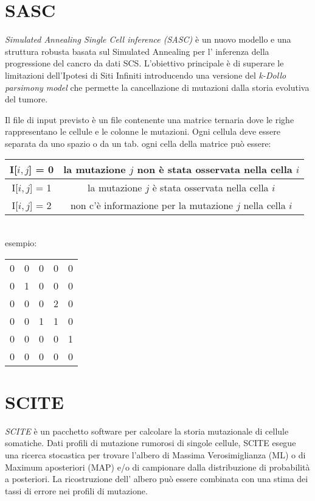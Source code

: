 \section{SASC}
\textit{Simulated Annealing Single Cell inference (SASC)}\cite{sasc} è un nuovo modello e una struttura robusta basata sul Simulated Annealing per l' inferenza della progressione del cancro da dati SCS. L'obiettivo principale è di superare le limitazioni dell'Ipotesi di Siti Infiniti introducendo una versione del \textit{k-Dollo parsimony model} che permette la cancellazione di mutazioni dalla storia evolutiva del tumore.

Il file di input previsto è un file contenente una matrice ternaria dove le righe rappresentano le cellule e le colonne le mutazioni. Ogni cellula deve essere separata da uno spazio o da un tab. ogni cella della matrice può essere:
\begin{center}
\begin{tabular}{ | c | c | }
	\hline
	I[$i,j$] = 0 & la mutazione $j$ non è stata osservata nella cella $i$ \\
	\hline
	I[$i,j$] = 1 & la mutazione $j$ è stata osservata nella cella $i$ \\
	\hline
	I[$i,j$] = 2 & non c'è informazione per la mutazione $j$ nella cella $i$ \\
	\hline
\end{tabular}
\\
\smallskip
esempio:
\\
\smallskip
\begin{tabular}{  c c c c c }
	0 & 0 & 0 & 0 & 0 \\
	0 & 1 & 0 & 0 & 0 \\
	0 & 0 & 0 & 2 & 0 \\
	0 & 0 & 1 & 1 & 0 \\
	0 & 0 & 0 & 0 & 1 \\
	0 & 0 & 0 & 0 & 0 \\

\end{tabular}
\end{center}

\section{SCITE} 
\textit{SCITE}\cite{scite} è un pacchetto software per calcolare la storia mutazionale di cellule somatiche. Dati profili di mutazione rumorosi di singole cellule, SCITE esegue una ricerca stocastica per trovare l'albero di Massima Verosimiglianza (ML) o di Maximum aposteriori (MAP) e/o di campionare dalla distribuzione di probabilità a posteriori. La ricostruzione dell' albero può essere combinata con una stima dei tassi di errore nei profili di mutazione.


